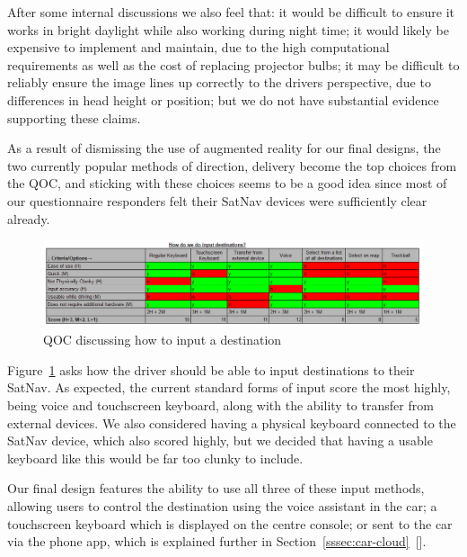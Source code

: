 \documentclass{article}
\begin{document}
After some internal discussions we also feel that: it would be difficult to ensure it works in bright daylight while also working during night time; it would likely be expensive to implement and maintain, due to the high computational requirements as well as the cost of replacing projector bulbs; it may be difficult to reliably ensure the image lines up correctly to the drivers perspective, due to differences in head height or position; but we do not have substantial evidence supporting these claims.

As a result of dismissing the use of augmented reality for our final designs, the two currently popular methods of direction, delivery become the top choices from the QOC, and sticking with these choices seems to be a good idea since most of our questionnaire responders felt their SatNav devices were sufficiently clear already.

\begin{figure}[H]
  \centering
  \includegraphics[width=\linewidth]{qoc-nav-input}
  \caption{QOC discussing how to input a destination}\label{qoc-input}
\end{figure}
Figure~\ref{qoc-input} asks how the driver should be able to input destinations to their SatNav. As expected, the current standard forms of input score the most highly, being voice and touchscreen keyboard, along with the ability to transfer from external devices. We also considered having a physical keyboard connected to the SatNav device, which also scored highly, but we decided that having a usable keyboard like this would be far too clunky to include.

Our final design features the ability to use all three of these input methods, allowing users to control the destination using the voice assistant in the car; a touchscreen keyboard which is displayed on the centre console; or sent to the car via the phone app, which is explained further in Section~\ref{sssec:car-cloud}~[].
\end{document}
